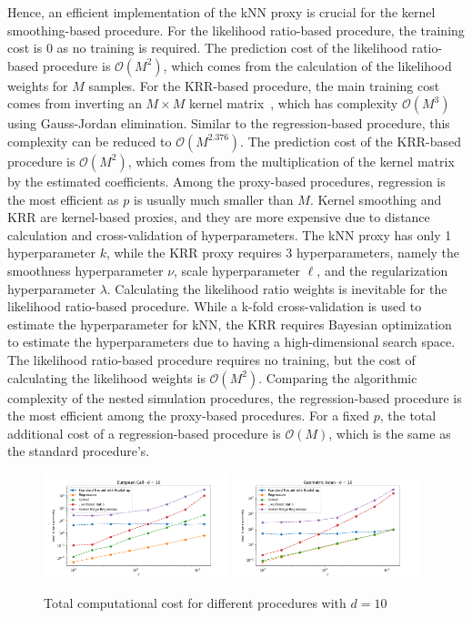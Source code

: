 Hence, an efficient implementation of the kNN proxy is crucial for the kernel smoothing-based procedure.
For the likelihood ratio-based procedure, the training cost is $0$ as no training is required.
The prediction cost of the likelihood ratio-based procedure is $\mathcal{O}(M^2)$, which comes from the calculation of the likelihood weights for $M$ samples.
For the KRR-based procedure, the main training cost comes from inverting an $M \times M$ kernel matrix~\citep{scholkopf2002learning}, which has complexity $\mathcal{O}(M^3)$ using Gauss-Jordan elimination.
Similar to the regression-based procedure, this complexity can be reduced to $\mathcal{O}(M^{2.376})$.
The prediction cost of the KRR-based procedure is $\mathcal{O}(M^2)$, which comes from the multiplication of the kernel matrix by the estimated coefficients.
Among the proxy-based procedures, regression is the most efficient as $p$ is usually much smaller than $M$. 
Kernel smoothing and KRR are kernel-based proxies, and they are more expensive due to distance calculation and cross-validation of hyperparameters. 
The kNN proxy has only 1 hyperparameter $k$, while the KRR proxy requires 3 hyperparameters, namely the smoothness hyperparameter $\nu$, scale hyperparameter $\ell$, and the regularization hyperparameter $\lambda$.
Calculating the likelihood ratio weights is inevitable for the likelihood ratio-based procedure. 
While a k-fold cross-validation is used to estimate the hyperparameter for kNN, the KRR requires Bayesian optimization~\citep{shahriari2015taking} to estimate the hyperparameters due to having a high-dimensional search space.
The likelihood ratio-based procedure requires no training, but the cost of calculating the likelihood weights is $\mathcal{O}(M^2)$.
Comparing the algorithmic complexity of the nested simulation procedures, the regression-based procedure is the most efficient among the proxy-based procedures.
For a fixed $p$, the total additional cost of a regression-based procedure is $\mathcal{O}(M)$, which is the same as the standard procedure's.


\begin{figure}[ht!]
    \centering
    \includegraphics[width=0.48\textwidth]{./project1/figures/figure11a.png}
    \includegraphics[width=0.48\textwidth]{./project1/figures/figure11b.png}
    \caption{Total computational cost for different procedures with $d=10$}
    \label{fig1:tcc}
\end{figure}


